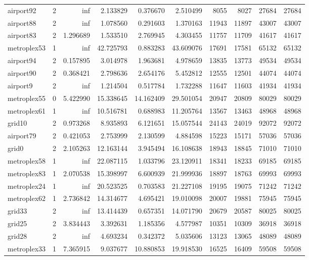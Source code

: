 \begin{longtable}{|l|r|r|r|r|r|r|r|r|r|}
airport92 & 2 & inf & 2.133829 & 0.376670 & 2.510499 & 8055 & 8027 & 27684 & 27684 \\
airport88 & 2 & inf & 1.078560 & 0.291603 & 1.370163 & 11943 & 11897 & 43007 & 43007 \\
airport83 & 2 & 1.296689 & 1.533510 & 2.769945 & 4.303455 & 11757 & 11709 & 41617 & 41617 \\
metroplex53 & 1 & inf & 42.725793 & 0.883283 & 43.609076 & 17691 & 17581 & 65132 & 65132 \\
airport94 & 2 & 0.157895 & 3.014978 & 1.963681 & 4.978659 & 13835 & 13773 & 49534 & 49534 \\
airport90 & 2 & 0.368421 & 2.798636 & 2.654176 & 5.452812 & 12555 & 12501 & 44074 & 44074 \\
airport9 & 2 & inf & 1.214504 & 0.517784 & 1.732288 & 11647 & 11603 & 41934 & 41934 \\
metroplex55 & 0 & 5.422990 & 15.338645 & 14.162409 & 29.501054 & 20947 & 20809 & 80029 & 80029 \\
metroplex61 & 1 & inf & 10.516781 & 0.688983 & 11.205764 & 13567 & 13463 & 48968 & 48968 \\
grid10 & 2 & 0.973268 & 8.935893 & 6.121651 & 15.057544 & 24143 & 24019 & 92072 & 92072 \\
airport79 & 2 & 0.421053 & 2.753999 & 2.130599 & 4.884598 & 15223 & 15171 & 57036 & 57036 \\
grid0 & 2 & 2.105263 & 12.163144 & 3.945494 & 16.108638 & 18943 & 18845 & 71010 & 71010 \\
metroplex58 & 1 & inf & 22.087115 & 1.033796 & 23.120911 & 18341 & 18233 & 69185 & 69185 \\
metroplex83 & 1 & 2.070538 & 15.398997 & 6.600939 & 21.999936 & 18897 & 18763 & 69993 & 69993 \\
metroplex24 & 1 & inf & 20.523525 & 0.703583 & 21.227108 & 19195 & 19075 & 71242 & 71242 \\
metroplex62 & 1 & 2.736842 & 14.314677 & 4.695421 & 19.010098 & 20007 & 19881 & 75945 & 75945 \\
grid33 & 2 & inf & 13.414439 & 0.657351 & 14.071790 & 20679 & 20587 & 80025 & 80025 \\
grid25 & 2 & 3.834443 & 3.392631 & 1.185356 & 4.577987 & 10351 & 10309 & 36918 & 36918 \\
grid28 & 2 & inf & 4.693234 & 0.342372 & 5.035606 & 13123 & 13065 & 48089 & 48089 \\
metroplex33 & 1 & 7.365915 & 9.037677 & 10.880853 & 19.918530 & 16525 & 16409 & 59508 & 59508 \\

\end{longtable}
